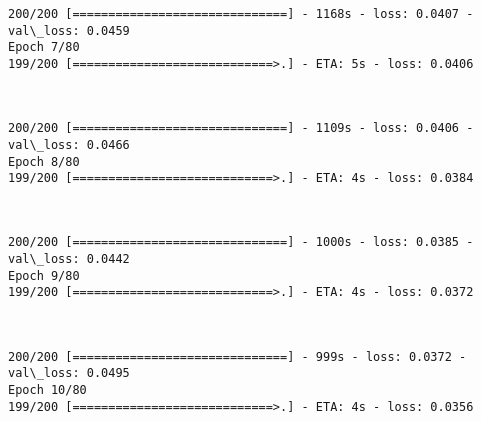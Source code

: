 \documentclass[11pt]{article}
\begin{document}
    \begin{Verbatim}[commandchars=\\\{\}]
200/200 [==============================] - 1168s - loss: 0.0407 - val\_loss: 0.0459
Epoch 7/80
199/200 [============================>.] - ETA: 5s - loss: 0.0406 
    \end{Verbatim}

    \begin{center}
    \end{center}
    { \hspace*{\fill} \\}
    
    \begin{Verbatim}[commandchars=\\\{\}]
200/200 [==============================] - 1109s - loss: 0.0406 - val\_loss: 0.0466
Epoch 8/80
199/200 [============================>.] - ETA: 4s - loss: 0.0384
    \end{Verbatim}

    \begin{center}
    \end{center}
    { \hspace*{\fill} \\}
    
    \begin{Verbatim}[commandchars=\\\{\}]
200/200 [==============================] - 1000s - loss: 0.0385 - val\_loss: 0.0442
Epoch 9/80
199/200 [============================>.] - ETA: 4s - loss: 0.0372
    \end{Verbatim}

    \begin{center}
    \end{center}
    { \hspace*{\fill} \\}
    
    \begin{Verbatim}[commandchars=\\\{\}]
200/200 [==============================] - 999s - loss: 0.0372 - val\_loss: 0.0495
Epoch 10/80
199/200 [============================>.] - ETA: 4s - loss: 0.0356
    \end{Verbatim}

    \begin{center}
    \end{center}
    { \hspace*{\fill} \\}
    
\end{document}
